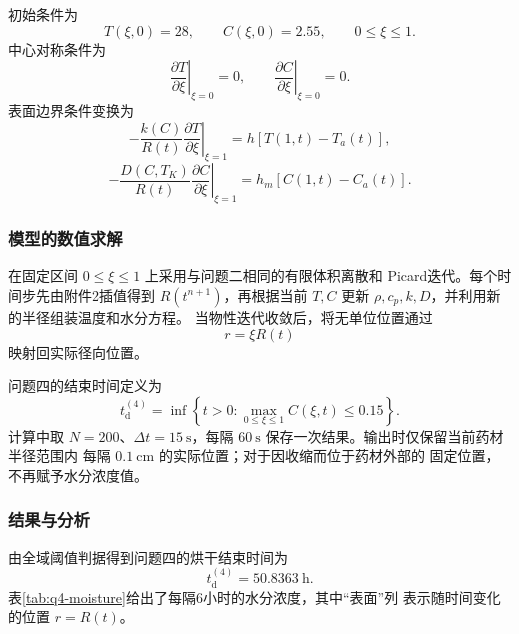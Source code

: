\documentclass[12pt,a4paper]{article}
\renewcommand{\boxed}[1]{#1}
\begin{document}
初始条件为
\begin{equation}
T(\xi,0)=28,\qquad C(\xi,0)=2.55,
\qquad 0\leq\xi\leq1.
\label{eq:q4-initial}
\end{equation}
中心对称条件为
\begin{equation}
\left.\frac{\partial T}{\partial\xi}\right|_{\xi=0}=0,
\qquad
\left.\frac{\partial C}{\partial\xi}\right|_{\xi=0}=0.
\label{eq:q4-center}
\end{equation}
表面边界条件变换为
\begin{equation}
-\frac{k(C)}{R(t)}
\left.\frac{\partial T}{\partial\xi}\right|_{\xi=1}
=h[T(1,t)-T_a(t)],
\label{eq:q4-heat-bc}
\end{equation}
\begin{equation}
-\frac{D(C,T_K)}{R(t)}
\left.\frac{\partial C}{\partial\xi}\right|_{\xi=1}
=h_m[C(1,t)-C_a(t)].
\label{eq:q4-moisture-bc}
\end{equation}

\subsubsection{模型的数值求解}

在固定区间 $0\leq\xi\leq1$ 上采用与问题二相同的有限体积离散和
Picard迭代。每个时间步先由附件2插值得到 $R(t^{n+1})$，再根据当前
$T,C$ 更新 $\rho,c_p,k,D$，并利用新的半径组装温度和水分方程。
当物性迭代收敛后，将无单位位置通过
\begin{equation}
r=\xi R(t)
\label{eq:q4-back-transform}
\end{equation}
映射回实际径向位置。

问题四的结束时间定义为
\begin{equation}
\boxed{
t_{\mathrm d}^{(4)}
=\inf\left\{t>0:
\max_{0\leq\xi\leq1}C(\xi,t)\leq0.15\right\}
}.
\label{eq:q4-dry-time}
\end{equation}
计算中取 $N=200$、$\Delta t=15\ \mathrm{s}$，每隔
$60\ \mathrm{s}$ 保存一次结果。输出时仅保留当前药材半径范围内
每隔 $0.1\ \mathrm{cm}$ 的实际位置；对于因收缩而位于药材外部的
固定位置，不再赋予水分浓度值。

\subsubsection{结果与分析}

由全域阈值判据得到问题四的烘干结束时间为
\begin{equation}
\boxed{t_{\mathrm d}^{(4)}=50.8363\ \mathrm{h}}.
\label{eq:q4-result-time}
\end{equation}
表\ref{tab:q4-moisture}给出了每隔6小时的水分浓度，其中“表面”列
表示随时间变化的位置 $r=R(t)$。
\end{document}

